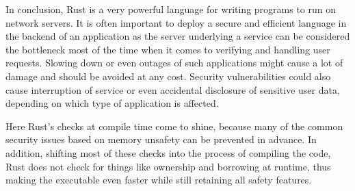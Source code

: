 In conclusion, Rust is a very powerful language for writing programs to run on network servers. It is often important
to deploy a secure and efficient language in the backend of an application as the server underlying a service can be
considered the bottleneck most of the time when it comes to verifying and handling user requests. Slowing down or even
outages of such applications might cause a lot of damage and should be avoided at any cost. Security vulnerabilities
could also cause interruption of service or even accidental disclosure of sensitive user data, depending on which type
of application is affected.

Here Rust's checks at compile time come to shine, because many of the common security issues based on memory unsafety
can be prevented in advance. In addition, shifting most of these checks into the process of compiling the code, Rust
does not check for things like ownership and borrowing at runtime, thus making the executable even faster while still
retaining all safety features.
